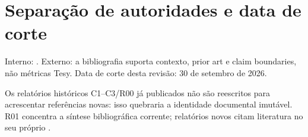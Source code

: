 \section{Separação de autoridades e data de corte}
Interno: . Externo: a bibliografia suporta contexto, prior art e claim boundaries, não métricas Tesy. Data de corte desta revisão: 30 de setembro de 2026.

Os relatórios históricos C1--C3/R00 já publicados não são reescritos para acrescentar referências novas: isso quebraria a identidade documental imutável. R01 concentra a síntese bibliográfica corrente; relatórios novos citam literatura no seu próprio .
